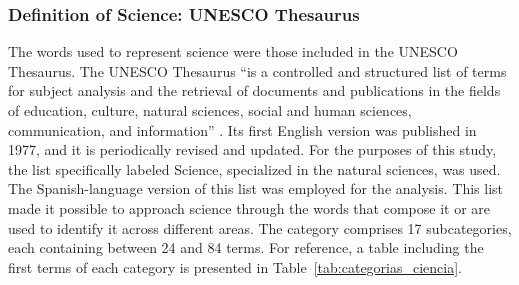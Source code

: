 \documentclass[pdflatex,sn-mathphys-num,iicol]{sn-jnl}
\begin{document}
	
	\subsubsection{Definition of Science: UNESCO Thesaurus}\label{subsubsec:thesaurus}
	
	The words used to represent science were those included in the UNESCO Thesaurus. The UNESCO Thesaurus ``is a controlled and structured list of terms for subject analysis and the retrieval of documents and publications in the fields of education, culture, natural sciences, social and human sciences, communication, and information'' \cite{unesco_thesaurus_1977}. Its first English version was published in 1977, and it is periodically revised and updated. For the purposes of this study, the list specifically labeled Science, specialized in the natural sciences, was used. The Spanish-language version of this list was employed for the analysis. This list made it possible to approach science through the words that compose it or are used to identify it across different areas. The category comprises 17 subcategories, each containing between 24 and 84 terms. For reference, a table including the first terms of each category is presented in Table~\ref{tab:categorias_ciencia}.
	
\end{document}
